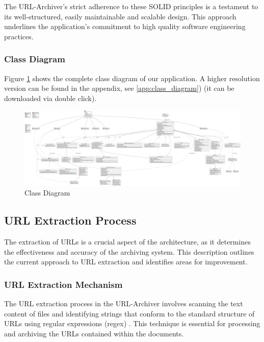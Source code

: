 The URL-Archiver's strict adherence to these SOLID principles  is a testament to its well-structured, easily maintainable and scalable design. This approach underlines the application's commitment to high quality software engineering practices.
\begin{landscape}
	\thispagestyle{empty}
	\subsubsection{Class Diagram}
	Figure \ref{fig:class_diagram} shows the complete class diagram of our application. A higher resolution version can be found in the appendix, see \ref{app:class_diagram}) (it can be downloaded via double click). 
	\begin{figure}[h!]
		\includegraphics[width=1.9\textwidth]{./diagrams/uml_diagram.pdf}
		\centering
		\caption{Class Diagram}
		\label{fig:class_diagram}
	\end{figure}

\end{landscape}
\restoregeometry

\subsection{URL Extraction Process}

The extraction of URLs is a crucial aspect of the architecture, as it determines the effectiveness and accuracy of the archiving system. This description outlines the current approach to URL extraction and identifies areas for improvement.

\subsubsection{URL Extraction Mechanism}
The URL extraction process in the URL-Archiver involves scanning the text content of files and identifying strings that conform to the standard structure of URLs using regular expressions (\gls{regex}) . This technique is essential for processing and archiving the URLs contained within the documents.

